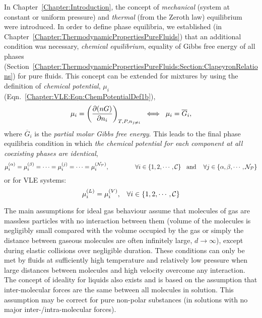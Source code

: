 In Chapter~\ref{Chapter:Introduction}, the concept of {\it mechanical} (\ie system at constant or uniform pressure) and {\it thermal} (from the Zeroth law) equilibrium were introduced. In order to define phase equilibria, we established (in Chapter~\ref{Chapter:ThermodynamicPropertiesPureFluids}) that an additional condition was necessary, {\it chemical equilibrium}, \ie equality of Gibbs free energy of all phases (Section~\ref{Chapter:ThermodynamicPropertiesPureFluids:Section:ClapeyronRelations}) for pure fluids. This concept can be extended for mixtures by using the definition of {\it chemical potential}, $\mu_{i}$ (Eqn.~\ref{Chapter:VLE:Eqn:ChemPotentialDef1b}),
         \begin{displaymath}
            \mu_{i} = \Partial[(nG)]{n_{i}}{T,P,n_{j\ne i}} \;\;\Longleftrightarrow\;\; \mu_{i} = \overline{G}_{i},
         \end{displaymath}
where $\overline{G}_{i}$ is the {\it partial molar Gibbs free energy}. This leads to the final phase equilibria condition in which {\it the chemical potential for each component at all coexisting phases are identical}, \ie 
         \begin{displaymath}
           \mfr[\mu]{i}{\alpha} = \mfr[\mu]{i}{\beta} = \cdots =  \mfr[\mu]{i}{j} = \cdots = \mfr[\mu]{i}{\mathcal{N}_{\mathcal{P}}}, \hspace{1.5cm} \forall i\in\{1,2,\cdots,\mathcal{C}\}\;\; \text{ and }\;\;\; \forall j\in\{\alpha,\beta,\cdots,\mathcal{N}_{\mathcal{P}}\}
         \end{displaymath}
         or for VLE systems:
         \begin{displaymath}
           \mfr[\mu]{i}{L} = \mfr[\mu]{i}{V},\;\;\;\forall i\in\{1,2,\cdots,\mathcal{C}\}
         \end{displaymath}

\medskip

The main assumptions for ideal gas behaviour assume that molecules of gas are massless particles with no interaction between them (\ie volume of the molecules is negligibly small compared with the volume occupied by the gas or simply the distance between gaseous molecules are often infinitely large, $d\rightarrow \infty$), except during elastic collisions over negligible duration. These conditions can only be met by fluids at sufficiently high temperature and relatively low pressure when large distances between molecules and high velocity overcome any interaction. The concept of ideality for liquids also exists and is based on the assumption that inter-molecular forces are the same between all molecules in solution. This assumption may be correct for pure non-polar substances (\ie in solutions with no major inter-/intra-molecular forces).


